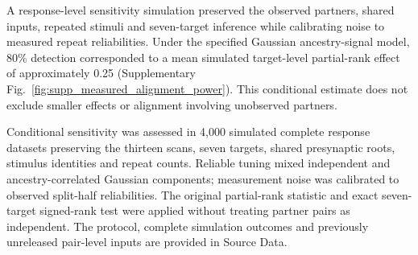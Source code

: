A response-level sensitivity simulation preserved the observed partners, shared inputs, repeated stimuli and seven-target inference while calibrating noise to measured repeat reliabilities. Under the specified Gaussian ancestry-signal model, 80\% detection corresponded to a mean simulated target-level partial-rank effect of approximately 0.25 (Supplementary Fig.~\ref{fig:supp_measured_alignment_power}). This conditional estimate does not exclude smaller effects or alignment involving unobserved partners.

Conditional sensitivity was assessed in 4,000 simulated complete response datasets preserving the thirteen scans, seven targets, shared presynaptic roots, stimulus identities and repeat counts. Reliable tuning mixed independent and ancestry-correlated Gaussian components; measurement noise was calibrated to observed split-half reliabilities. The original partial-rank statistic and exact seven-target signed-rank test were applied without treating partner pairs as independent. The protocol, complete simulation outcomes and previously unreleased pair-level inputs are provided in Source Data.
